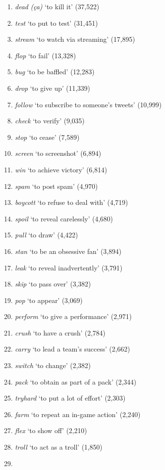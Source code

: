 \documentclass[output=paper,colorlinks,citecolor=brown]{langscibook}
\begin{document}
\begin{enumerate}[itemsep=2pt, parsep=0pt]
	\def\labelenumi{\arabic{enumi}.}
	\item
	\emph{dead (ça)} `to kill it' (37,522)
	\item
	\emph{test} `to put to test' (31,451)
	\item
	\emph{stream} `to watch via streaming' (17,895)
	\item
	\emph{flop} `to fail' (13,328)
	\item
	\emph{bug} `to be baffled' (12,283)
	\item
	\emph{drop} `to give up' (11,339)
	\item
	\emph{follow} `to subscribe to someone's tweets' (10,999)
	\item
	\emph{check} `to verify' (9,035)
	\item
	\emph{stop} `to cease' (7,589)
	\item
	\emph{screen} `to screenshot' (6,894)
	\item
	\emph{win} `to achieve victory' (6,814)
	\item
	\emph{spam} `to post spam' (4,970)
	\item
	\emph{boycott} `to refuse to deal with' (4,719)
	\item
	\emph{spoil} `to reveal carelessly' (4,680)
	\item
	\emph{pull} `to draw' (4,422)
	\item
	\emph{stan} `to be an obsessive fan' (3,894)
	\item
	\emph{leak} `to reveal inadvertently' (3,791)
	\item
	\emph{skip} `to pass over' (3,382)
	\item
	\emph{pop} `to appear' (3,069)
	\item
	\emph{perform} `to give a performance' (2,971)
	\item
	\emph{crush} `to have a crush' (2,784)
	\item
	\emph{carry} `to lead a team's success' (2,662)
	\item
	\emph{switch} `to change' (2,382)
	\item
	\emph{pack} `to obtain as part of a pack' (2,344)
	\item
	\emph{tryhard} `to put a lot of effort' (2,303)
	\item
	\emph{farm} `to repeat an in-game action' (2,240)
	\item
	\emph{flex} `to show off' (2,210)
	\item
	\emph{troll} `to act as a troll' (1,850)
	\item

\end{enumerate}
\end{document}
